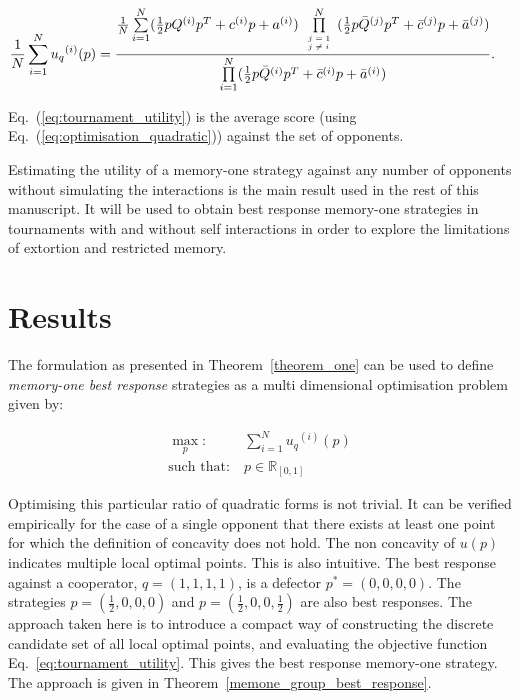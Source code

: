 \documentclass[10pt]{article}
\newcommand{\R}{\mathbb{R}}
\begin{document}
\begin{align}\label{eq:tournament_utility}
       & \frac{1}{N} \sum\limits_{i=1} ^ {N} {u_q}^{(i)} (p) =
       \frac{\frac{1}{N} \sum\limits_{i=1} ^ {N} (\frac{1}{2} pQ^{(i)} p^T + c^{(i)} p + a^ {(i)})
       \prod\limits_{\tiny\begin{array}{l} j=1 \\ j \neq i \end{array}} ^
       N (\frac{1}{2} p\bar{Q}^{(j)} p^T + \bar{c}^{(j)} p + \bar{a}^ {(j)})}
       {\prod\limits_{i=1} ^ N (\frac{1}{2} p\bar{Q}^{(i)} p^T + \bar{c}^{(i)} p + \bar{a}^ {(i)})}.
\end{align}

Eq.~(\ref{eq:tournament_utility}) is the average score (using Eq.~(\ref{eq:optimisation_quadratic})) against the set of opponents.

Estimating the utility of a memory-one strategy against any number of opponents
without simulating the interactions is the main result used in the rest of this manuscript.
It will be used to obtain best response memory-one strategies in tournaments
with and without self interactions in order to explore the limitations of extortion
and restricted memory.

\section{Results}\label{section:results}

The formulation as presented in Theorem~\ref{theorem_one} can be used to
define \textit{memory-one best response} strategies as a multi dimensional
optimisation problem given by:

\begin{equation}\label{eq:mo_tournament_optimisation}
    \begin{aligned}
    \max_p: & \ \sum_{i=1} ^ {N} {u_q}^{(i)} (p)
    \\
    \text{such that}: & \ p \in \R_{[0, 1]}
    \end{aligned}
\end{equation}

Optimising this particular ratio of quadratic forms is not trivial. It can be
verified empirically for the case of a single opponent that there exists at
least one point for which the definition of concavity does not hold.
The non concavity of \(u(p)\) indicates multiple local
optimal points. This is also intuitive. The best response against a cooperator,
\(q=(1, 1, 1, 1)\), is a defector \(p^*=(0, 0, 0, 0)\). The strategies
\(p=(\frac{1}{2}, 0, 0, 0)\) and \(p=(\frac{1}{2}, 0, 0, \frac{1}{2})\) are also
best responses. The approach taken here is to introduce a compact way of
constructing the discrete candidate set of all local optimal points, and evaluating
the objective function Eq.~\ref{eq:tournament_utility}. This gives the best
response memory-one strategy. The approach is given in
Theorem~\ref{memone_group_best_response}.
\end{document}
